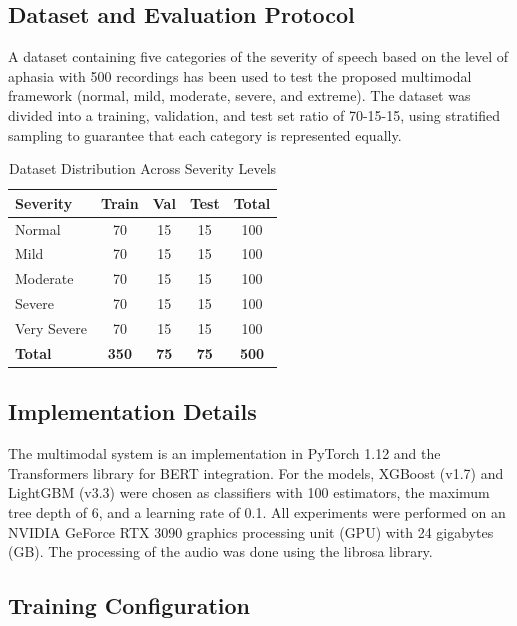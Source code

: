 \documentclass[conference]{IEEEtran}
\begin{document}
\subsection{Dataset and Evaluation Protocol}

A dataset containing five categories of the severity of speech based on the level of aphasia with 500 recordings has been used to test the proposed multimodal framework (normal, mild, moderate, severe, and extreme)\cite{goodglass2001}. The dataset was divided into a training, validation, and test set ratio of 70-15-15, using stratified sampling to guarantee that each category is represented equally.

\begin{table}[htbp]
\caption{Dataset Distribution Across Severity Levels}
\begin{center}
\begin{tabular}{|l|c|c|c|c|}
\hline
\textbf{Severity} & \textbf{Train} & \textbf{Val} & \textbf{Test} & \textbf{Total} \\
\hline
Normal & 70 & 15 & 15 & 100 \\
Mild & 70 & 15 & 15 & 100 \\
Moderate & 70 & 15 & 15 & 100 \\
Severe & 70 & 15 & 15 & 100 \\
Very Severe & 70 & 15 & 15 & 100 \\
\hline
\textbf{Total} & \textbf{350} & \textbf{75} & \textbf{75} & \textbf{500} \\
\hline
\end{tabular}
\end{center}
\label{tab:dataset}
\end{table}

\subsection{Implementation Details}

The multimodal system is an implementation in PyTorch 1.12 and the Transformers library for BERT integration\cite{devlin2019}. For the models, XGBoost (v1.7) and LightGBM (v3.3) were chosen as classifiers with 100 estimators, the maximum tree depth of 6, and a learning rate of 0.1\cite{chen2016xgboost,ke2017lightgbm}. All experiments were performed on an NVIDIA GeForce RTX 3090 graphics processing unit (GPU) with 24 gigabytes (GB). The processing of the audio was done using the librosa library.

\subsection{Training Configuration}
\end{document}
